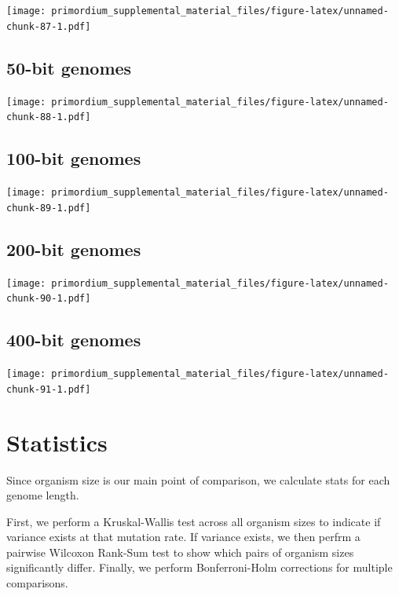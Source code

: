 \documentclass[]{book}
\begin{document}
\texttt{[image: primordium\_supplemental\_material\_files/figure-latex/unnamed-chunk-87-1.pdf]}

\hypertarget{bit-genomes-1}{%
\subsection{50-bit genomes}\label{bit-genomes-1}}

\texttt{[image: primordium\_supplemental\_material\_files/figure-latex/unnamed-chunk-88-1.pdf]}

\hypertarget{bit-genomes-2}{%
\subsection{100-bit genomes}\label{bit-genomes-2}}

\texttt{[image: primordium\_supplemental\_material\_files/figure-latex/unnamed-chunk-89-1.pdf]}

\hypertarget{bit-genomes-3}{%
\subsection{200-bit genomes}\label{bit-genomes-3}}

\texttt{[image: primordium\_supplemental\_material\_files/figure-latex/unnamed-chunk-90-1.pdf]}

\hypertarget{bit-genomes-4}{%
\subsection{400-bit genomes}\label{bit-genomes-4}}

\texttt{[image: primordium\_supplemental\_material\_files/figure-latex/unnamed-chunk-91-1.pdf]}

\hypertarget{statistics-5}{%
\section{Statistics}\label{statistics-5}}

Since organism size is our main point of comparison, we calculate stats for each genome length.

First, we perform a Kruskal-Wallis test across all organism sizes to indicate if variance exists at that mutation rate.
If variance exists, we then perfrm a pairwise Wilcoxon Rank-Sum test to show which pairs of organism sizes significantly differ.
Finally, we perform Bonferroni-Holm corrections for multiple comparisons.
\end{document}
